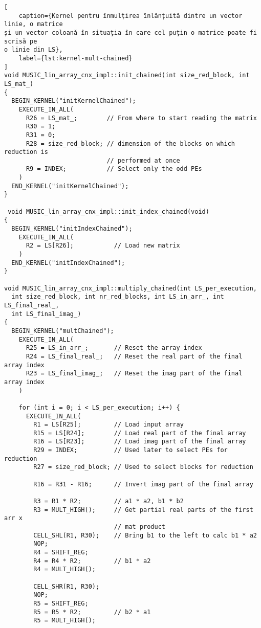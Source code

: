 \begin{lstlisting}[
    caption={Kernel pentru înmulțirea înlănțuită dintre un vector linie, o matrice
și un vector coloană în situația în care cel puțin o matrice poate fi scrisă pe
o linie din LS},
    label={lst:kernel-mult-chained}
]
void MUSIC_lin_array_cnx_impl::init_chained(int size_red_block, int LS_mat_)
{
  BEGIN_KERNEL("initKernelChained");
    EXECUTE_IN_ALL(
      R26 = LS_mat_;        // From where to start reading the matrix
      R30 = 1;
      R31 = 0;
      R28 = size_red_block; // dimension of the blocks on which reduction is
                            // performed at once
      R9 = INDEX;           // Select only the odd PEs
    )
  END_KERNEL("initKernelChained");
}

 void MUSIC_lin_array_cnx_impl::init_index_chained(void)
{
  BEGIN_KERNEL("initIndexChained");
    EXECUTE_IN_ALL(
      R2 = LS[R26];           // Load new matrix
    )
  END_KERNEL("initIndexChained");
}

void MUSIC_lin_array_cnx_impl::multiply_chained(int LS_per_execution,
  int size_red_block, int nr_red_blocks, int LS_in_arr_, int LS_final_real_,
  int LS_final_imag_)
{
  BEGIN_KERNEL("multChained");
    EXECUTE_IN_ALL(
      R25 = LS_in_arr_;       // Reset the array index
      R24 = LS_final_real_;   // Reset the real part of the final array index
      R23 = LS_final_imag_;   // Reset the imag part of the final array index
    )

    for (int i = 0; i < LS_per_execution; i++) {
      EXECUTE_IN_ALL(
        R1 = LS[R25];         // Load input array
        R15 = LS[R24];        // Load real part of the final array
        R16 = LS[R23];        // Load imag part of the final array
        R29 = INDEX;          // Used later to select PEs for reduction
        R27 = size_red_block; // Used to select blocks for reduction

        R16 = R31 - R16;      // Invert imag part of the final array

        R3 = R1 * R2;         // a1 * a2, b1 * b2
        R3 = MULT_HIGH();     // Get partial real parts of the first arr x
                              // mat product
        CELL_SHL(R1, R30);    // Bring b1 to the left to calc b1 * a2
        NOP;
        R4 = SHIFT_REG;
        R4 = R4 * R2;         // b1 * a2
        R4 = MULT_HIGH();

        CELL_SHR(R1, R30);
        NOP;
        R5 = SHIFT_REG;
        R5 = R5 * R2;         // b2 * a1
        R5 = MULT_HIGH();


\end{lstlisting}
